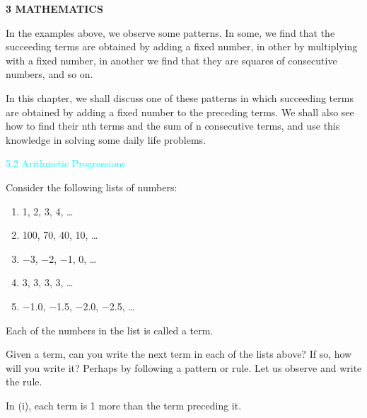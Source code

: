 \documentclass[12pt,a4paper]{book}
\makeatletter
\renewcommand{\headrulewidth}{0pt}
\renewcommand{\footrulewidth}{0pt}
\renewcommand{\section}{\@startsection{section}{1}{0mm}
  {-12pt}
  {6pt}
  {\normalfont\large\bfseries}}
\makeatother
\begin{document}
\newpage

\noindent\textbf{3 \hfill MATHEMATICS}

\noindent In the examples above, we observe some patterns. In some, we find that the
succeeding terms are obtained by adding a fixed number, in other by multiplying
with a fixed number, in another we find that they are squares of consecutive
numbers, and so on.

In this chapter, we shall discuss one of these patterns in which succeeding terms
are obtained by adding a fixed number to the preceding terms. We shall also see how
to find their nth terms and the sum of n consecutive terms, and use this knowledge in
solving some daily life problems.



\textcolor{cyan}{\section{5.2 Arithmetic Progressions}}

\noindent Consider the following lists of numbers:
\begin{enumerate}[label=(\roman*), itemsep=1pt]
    \item 1, 2, 3, 4, \ldots
    \item 100, 70, 40, 10, \ldots
    \item $-$3, $-$2, $-$1, 0, \ldots
    \item 3, 3, 3, 3, \ldots
    \item $-$1.0, $-$1.5, $-$2.0, $-$2.5, \ldots
\end{enumerate}

Each of the numbers in the list is called a term.

Given a term, can you write the next term in each of the lists above? If so, how
will you write it? Perhaps by following a pattern or rule. Let us observe and write the
rule.

In (i), each term is 1 more than the term preceding it.

\pagestyle{fancy}
\fancyhf{}
\renewcommand{\headrulewidth}{0pt}
\renewcommand{\footrulewidth}{0pt}


\setcounter{romancounter}{3} %
\end{document}
